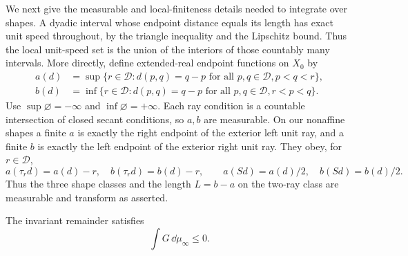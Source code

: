 We next give the measurable and local-finiteness details needed to
integrate over shapes.  A dyadic interval whose endpoint distance equals
its length has exact unit speed throughout, by the triangle inequality
and the Lipschitz bound.  Thus the local unit-speed set is the union of
the interiors of those countably many intervals.  More directly, define
extended-real endpoint functions on $X_0$ by
\begin{align}
 a(d)&=\sup\{r\in\mathcal D:
       d(p,q)=q-p\text{ for all }p,q\in\mathcal D, p<q<r\},
 \label{end:left-endpoint}\\
 b(d)&=\inf\{r\in\mathcal D:
       d(p,q)=q-p\text{ for all }p,q\in\mathcal D, r<p<q\}.
 \label{end:right-endpoint}
\end{align}
Use $\sup\varnothing=-\infty$ and $\inf\varnothing=+\infty$.
Each ray condition is a countable intersection of closed secant
conditions, so $a,b$ are measurable.  On our nonaffine shapes a finite
$a$ is exactly the right endpoint of the exterior left unit ray, and a
finite $b$ is exactly the left endpoint of the exterior right unit ray.
They obey, for $r\in\mathcal D$,
\begin{equation}\label{end:endpoint-covariance}
 a(\tau_r d)=a(d)-r,\quad b(\tau_r d)=b(d)-r,
 \qquad a(Sd)=a(d)/2,\quad b(Sd)=b(d)/2.
\end{equation}
Thus the three shape classes and the length $L=b-a$ on the two-ray
class are measurable and transform as asserted.

\begin{lemma}\label{end:remainder}
The invariant remainder satisfies
\begin{equation}\label{end:remainder-bound}
 \int G\,\dd\mu_\infty\le0.
\end{equation}
\end{lemma}


